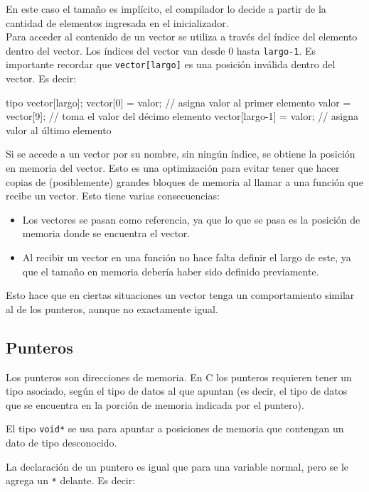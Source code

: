 En este caso el tamaño es implícito, el compilador lo decide a partir de la
cantidad de elementos ingresada en el inicializador. \\

Para acceder al contenido de un vector se utiliza a través del índice del
elemento dentro del vector. Los índices del vector van desde 0 hasta
\lstinline!largo-1!.  Es importante recordar que \lstinline!vector[largo]! es
una posición inválida dentro del vector. Es decir:

\begin{codigo-c-plano}
tipo vector[largo];
vector[0] = valor; // asigna valor al primer elemento
valor = vector[9]; // toma el valor del décimo elemento
vector[largo-1] = valor; // asigna valor al último elemento
\end{codigo-c-plano}

Si se accede a un vector por su nombre, sin ningún índice, se obtiene
la posición en memoria del vector. Esto es una optimización para evitar tener
que hacer copias de (posiblemente) grandes bloques de memoria al llamar a una
función que recibe un vector. Esto tiene varias consecuencias:

\begin{itemize}
\item Los vectores se pasan como referencia, ya que lo que se pasa es la
posición de memoria donde se encuentra el vector.

\item Al recibir un vector en una función no hace falta definir el largo de
este, ya que el tamaño en memoria debería haber sido definido previamente.
\end{itemize}

Esto hace que en ciertas situaciones un vector tenga un comportamiento similar
al de los punteros, aunque no exactamente igual.

\subsection{Punteros}

Los punteros son direcciones de memoria. En C los punteros requieren tener un
tipo asociado, según el tipo de datos al que apuntan (es decir, el tipo de
datos que se encuentra en la porción de memoria indicada por el puntero).

El tipo \lstinline!void*! se usa para apuntar a posiciones de memoria que
contengan un dato de tipo desconocido.

La declaración de un puntero es igual que para una variable normal, pero se le
agrega un \lstinline!*! delante. Es decir:

